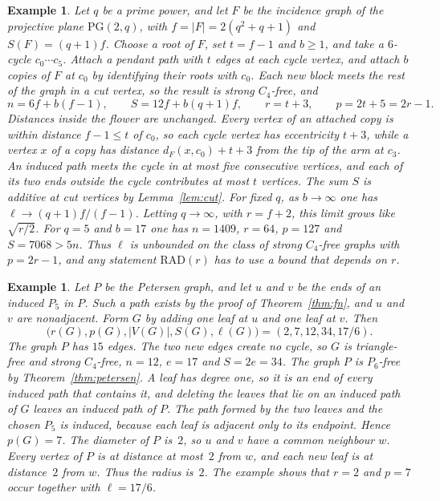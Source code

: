 \documentclass[ASNA]{USG}
\theoremstyle{WBstyletwo}
\newtheorem{example}[theorem]{Example}
\numberwithin{equation}{section}
\newcommand{\lr}{\ell}
\newcommand{\pp}{p}
\newcommand{\RAD}{\mathrm{RAD}}
\begin{document}
\begin{example}\label{ex:plane}
Let $q$ be a prime power, and let $F$ be the incidence graph of the projective plane $\mathrm{PG}(2,q)$, with $f=|F|=2(q^2+q+1)$ and $S(F)=(q+1)f$. Choose a root of $F$, set $t=f-1$ and $b\ge 1$, and take a $6$-cycle $c_0\cdots c_5$. Attach a pendant path with $t$ edges at each cycle vertex, and attach $b$ copies of $F$ at $c_0$ by identifying their roots with $c_0$. Each new block meets the rest of the graph in a cut vertex, so the result is strong $C_4$-free, and
\[
n=6f+b(f-1),\qquad S=12f+b(q+1)f,\qquad r=t+3,\qquad \pp=2t+5=2r-1.
\]
Distances inside the flower are unchanged. Every vertex of an attached copy is within distance $f-1\le t$ of $c_0$, so each cycle vertex has eccentricity $t+3$, while a vertex $x$ of a copy has distance $d_F(x,c_0)+t+3$ from the tip of the arm at $c_3$. An induced path meets the cycle in at most five consecutive vertices, and each of its two ends outside the cycle contributes at most $t$ vertices. The sum $S$ is additive at cut vertices by Lemma~\ref{lem:cut}. For fixed $q$, as $b\to\infty$ one has $\lr\to(q+1)f/(f-1)$. Letting $q\to\infty$, with $r=f+2$, this limit grows like $\sqrt{r/2}$. For $q=5$ and $b=17$ one has $n=1409$, $r=64$, $\pp=127$ and $S=7068>5n$. Thus $\lr$ is unbounded on the class of strong $C_4$-free graphs with $\pp=2r-1$, and any statement $\RAD(r)$ has to use a bound that depends on $r$.
\end{example}

\begin{example}\label{ex:p5leaves}
Let $P$ be the Petersen graph, and let $u$ and $v$ be the ends of an induced $P_5$ in $P$. Such a path exists by the proof of Theorem~\ref{thm:fn}, and $u$ and $v$ are nonadjacent. Form $G$ by adding one leaf at $u$ and one leaf at $v$. Then
\[
\bigl(r(G),\pp(G),|V(G)|,S(G),\lr(G)\bigr)=(2,7,12,34,17/6).
\]
The graph $P$ has $15$ edges. The two new edges create no cycle, so $G$ is triangle-free and strong $C_4$-free, $n=12$, $e=17$ and $S=2e=34$. The graph $P$ is $P_6$-free by Theorem~\ref{thm:petersen}. A leaf has degree one, so it is an end of every induced path that contains it, and deleting the leaves that lie on an induced path of $G$ leaves an induced path of $P$. The path formed by the two leaves and the chosen $P_5$ is induced, because each leaf is adjacent only to its endpoint. Hence $\pp(G)=7$. The diameter of $P$ is~$2$, so $u$ and $v$ have a common neighbour $w$. Every vertex of $P$ is at distance at most~$2$ from $w$, and each new leaf is at distance~$2$ from $w$. Thus the radius is~$2$. The example shows that $r=2$ and $\pp=7$ occur together with $\lr=17/6$.
\end{example}
\end{document}
